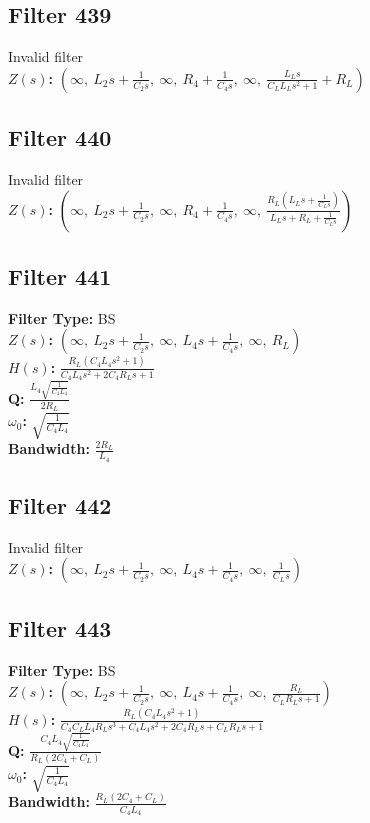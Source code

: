 \documentclass{article}
\begin{document}
\subsection*{Filter 439}
Invalid filter \\ 
\textbf{$Z(s)$:} $\left( \infty, \  L_{2} s + \frac{1}{C_{2} s}, \  \infty, \  R_{4} + \frac{1}{C_{4} s}, \  \infty, \  \frac{L_{L} s}{C_{L} L_{L} s^{2} + 1} + R_{L}\right)$ \\ 
\subsection*{Filter 440}
Invalid filter \\ 
\textbf{$Z(s)$:} $\left( \infty, \  L_{2} s + \frac{1}{C_{2} s}, \  \infty, \  R_{4} + \frac{1}{C_{4} s}, \  \infty, \  \frac{R_{L} \left(L_{L} s + \frac{1}{C_{L} s}\right)}{L_{L} s + R_{L} + \frac{1}{C_{L} s}}\right)$ \\ 
\subsection*{Filter 441}
\textbf{Filter Type:} BS \\ 
\textbf{$Z(s)$:} $\left( \infty, \  L_{2} s + \frac{1}{C_{2} s}, \  \infty, \  L_{4} s + \frac{1}{C_{4} s}, \  \infty, \  R_{L}\right)$ \\ 
\textbf{$H(s)$:} $\frac{R_{L} \left(C_{4} L_{4} s^{2} + 1\right)}{C_{4} L_{4} s^{2} + 2 C_{4} R_{L} s + 1}$ \\ 
\textbf{Q:} $\frac{L_{4} \sqrt{\frac{1}{C_{4} L_{4}}}}{2 R_{L}}$ \\ 
\textbf{$\omega_0$:} $\sqrt{\frac{1}{C_{4} L_{4}}}$ \\ 
\textbf{Bandwidth:} $\frac{2 R_{L}}{L_{4}}$ \\ 
\subsection*{Filter 442}
Invalid filter \\ 
\textbf{$Z(s)$:} $\left( \infty, \  L_{2} s + \frac{1}{C_{2} s}, \  \infty, \  L_{4} s + \frac{1}{C_{4} s}, \  \infty, \  \frac{1}{C_{L} s}\right)$ \\ 
\subsection*{Filter 443}
\textbf{Filter Type:} BS \\ 
\textbf{$Z(s)$:} $\left( \infty, \  L_{2} s + \frac{1}{C_{2} s}, \  \infty, \  L_{4} s + \frac{1}{C_{4} s}, \  \infty, \  \frac{R_{L}}{C_{L} R_{L} s + 1}\right)$ \\ 
\textbf{$H(s)$:} $\frac{R_{L} \left(C_{4} L_{4} s^{2} + 1\right)}{C_{4} C_{L} L_{4} R_{L} s^{3} + C_{4} L_{4} s^{2} + 2 C_{4} R_{L} s + C_{L} R_{L} s + 1}$ \\ 
\textbf{Q:} $\frac{C_{4} L_{4} \sqrt{\frac{1}{C_{4} L_{4}}}}{R_{L} \left(2 C_{4} + C_{L}\right)}$ \\ 
\textbf{$\omega_0$:} $\sqrt{\frac{1}{C_{4} L_{4}}}$ \\ 
\textbf{Bandwidth:} $\frac{R_{L} \left(2 C_{4} + C_{L}\right)}{C_{4} L_{4}}$ \\ 
\end{document}
